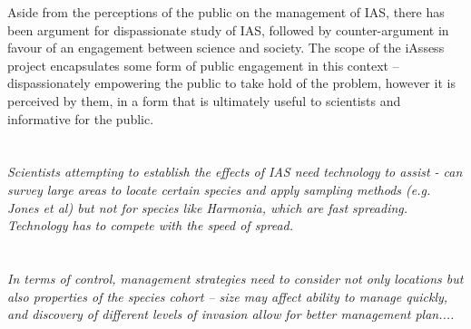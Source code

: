 \documentclass[10pt,psfig,letterpaper,twocolumn]{article}
\begin{document}
Aside from the perceptions of the public on the management of IAS, there has been argument \cite{Brown:2004uj} for dispassionate study of IAS, followed by counter-argument \cite{Larson:2007vs} in favour of an engagement between science and society. The scope of the iAssess project encapsulates some form of public engagement in this context -- dispassionately empowering the public to take hold of the problem, however it is perceived by them, in a form that is ultimately useful to scientists and informative for the public.

\section*{}

\emph{Scientists attempting to establish the effects of IAS need technology to assist - can survey large areas to locate certain species and apply sampling methods (e.g. Jones et al) but not for species like Harmonia, which are fast spreading. Technology has to compete with the speed of spread.}

\section*{}

\emph{In terms of control, management strategies need to consider not only locations but also properties of the species cohort -- size may affect ability to manage quickly, and discovery of different levels of invasion allow for better management plan....
}

\section*{}


{\footnotesize
}
\end{document}
